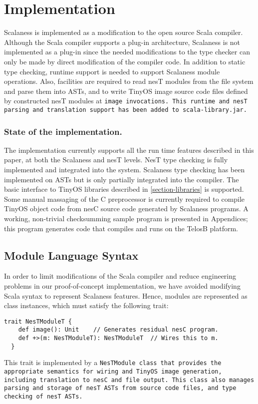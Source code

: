 \section{Implementation}
\label{section-implementation}

Scalaness is implemented as a modification to the open source Scala compiler. Although the Scala
compiler supports a plug-in architecture, Scalaness is not implemented as a plug-in since the
needed modifications to the type checker can only be made by direct modification of the compiler
code. In addition to static type checking, runtime support is needed to support Scalaness module
operations. Also, facilities are required to read nesT modules from the file system and parse
them into ASTs, and to write TinyOS image source code files defined by constructed nesT modules
at \tt{image} invocations. This runtime and nesT parsing and translation support has been added
to \texttt{\small scala-library.jar}.

\subsubsection{State of the implementation.} The implementation currently supports all the run
time features described in this paper, at both the Scalaness and nesT levels. NesT type checking
is fully implemented and integrated into the system. Scalaness type checking has been
implemented on ASTs but is only partially integrated into the compiler. The basic interface to
TinyOS libraries described in \autoref{section-libraries} is supported. Some manual massaging of
the C preprocessor is currently required to compile TinyOS object code from nesC source code
generated by Scalaness programs. A working, non-trivial checksumming sample program is presented
in Appendices; this program generates code that compiles and runs on the TelosB platform.

\subsection{Module Language Syntax}

In order to limit modifications of the Scala compiler and reduce engineering problems in our
proof-of-concept implementation, we have avoided modifying Scala syntax to represent Scalaness
features. Hence, modules are represented as class instances, which must satisfy the following
trait:
\begin{Verbatim}[fontfamily=cmtt,fontsize=\scriptsize]
  trait NesTModuleT {
    def image(): Unit    // Generates residual nesC program.
    def +>(m: NesTModuleT): NesTModuleT  // Wires this to m.
  }
\end{Verbatim}
This trait is implemented by a \tt{NesTModule} class that provides the appropriate semantics for
wiring and TinyOS image generation, including translation to nesC and file output. This class
also manages parsing and storage of nesT ASTs from source code files, and type checking of nesT
ASTs.

